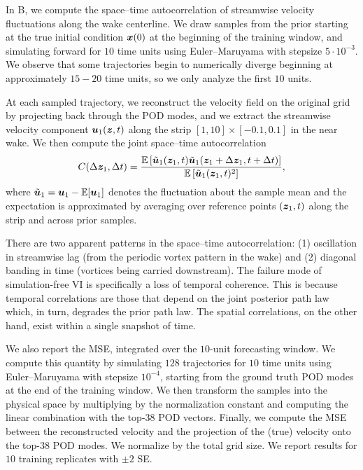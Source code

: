 In B, we compute the space--time autocorrelation of streamwise velocity fluctuations along the wake centerline. 
We draw samples from the prior starting at the true initial condition $\boldsymbol{x}(0)$ at the beginning of the training window, and simulating forward for $10$ time units using Euler--Maruyama with stepsize $5 \cdot 10^{-3}$. 
We observe that some trajectories begin to numerically diverge beginning at approximately $15-20$ time units, so we only analyze the first $10$ units.

At each sampled trajectory, we reconstruct the velocity field on the original grid by projecting back through the POD modes, and we extract the streamwise velocity component $\boldsymbol{u}_1(\boldsymbol{z}, t)$ along the strip $[1, 10] \times [-0.1, 0.1]$ in the near wake.
We then compute the joint space--time autocorrelation
\begin{equation*}
    C(\Delta \boldsymbol{z}_1, \Delta t) = \frac{\mathbb{E}\left[ \tilde{\boldsymbol{u}}_1(\boldsymbol{z}_1, t) \tilde{\boldsymbol{u}}_1(\boldsymbol{z}_1 + \Delta \boldsymbol{z}_1, t + \Delta t) \right]}{\mathbb{E}\left[ \tilde{\boldsymbol{u}}_1(\boldsymbol{z}_1, t)^2 \right]},
\end{equation*}
where $\tilde{\boldsymbol{u}}_1 = \boldsymbol{u}_1 - \mathbb{E}[\boldsymbol{u}_1]$ denotes the fluctuation about the sample mean and the expectation is approximated by averaging over reference points $(\boldsymbol{z}_1, t)$ along the strip and across prior samples.

There are two apparent patterns in the space--time autocorrelation: (1) oscillation in streamwise lag (from the periodic vortex pattern in the wake) and (2) diagonal banding in time (vortices being carried downstream).
The failure mode of simulation-free VI is specifically a loss of temporal coherence. 
This is because temporal correlations are those that depend on the joint posterior path law which, in turn, degrades the prior path law. The spatial correlations, on the other hand, exist within a single snapshot of time.

We also report the MSE, integrated over the $10$-unit forecasting window. 
We compute this quantity by simulating $128$ trajectories for $10$ time units using Euler--Maruyama with stepsize $10^{-4}$, starting from the ground truth POD modes at the end of the training window. 
We then transform the samples into the physical space by multiplying by the normalization constant and computing the linear combination with the top-$38$ POD vectors. Finally, we compute the MSE between the reconstructed velocity and the projection of the (true) velocity onto the top-$38$ POD modes. We normalize by the total grid size. 
We report results for $10$ training replicates with $\pm 2$ SE.

